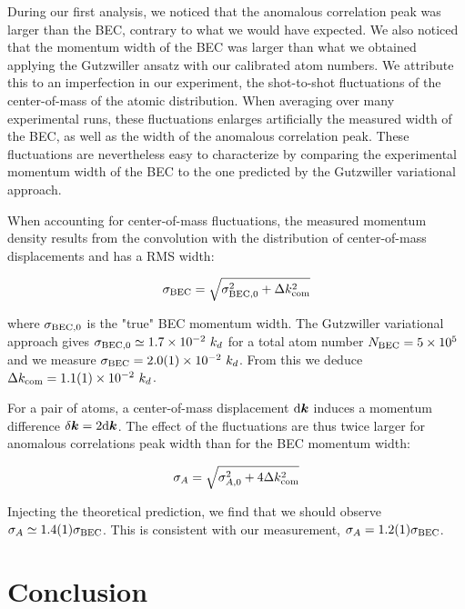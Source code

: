 During our first analysis, we noticed that the anomalous correlation peak was larger than the BEC, contrary to what we would have expected. We also noticed that the momentum width of the BEC was larger than what we obtained applying the Gutzwiller ansatz with our calibrated atom numbers. We attribute this to an imperfection in our experiment, the shot-to-shot fluctuations of the center-of-mass of the atomic distribution. When averaging over many experimental runs, these fluctuations enlarges artificially the measured width of the BEC, as well as the width of the anomalous correlation peak. These fluctuations are nevertheless easy to characterize by comparing the experimental momentum width of the BEC to the one predicted by the Gutzwiller variational approach.

When accounting for center-of-mass fluctuations, the measured momentum density results from the convolution with the distribution of center-of-mass displacements and has a RMS width:

\begin{equation}
    \sigma_{\rm{BEC}}=\sqrt{\sigma_{\rm{BEC},0}^2+\Delta k_{\rm{com}}^2}
\end{equation}

where $\sigma_{\rm{BEC},0}$ is the "true" BEC momentum width. The Gutzwiller variational approach gives  $\sigma_{\rm{BEC},0} \simeq 1.7 \times 10^{-2} \ k_d$ for a total atom number $N_{\rm{BEC}} = 5 \times 10^5$ and we measure $\sigma_{\rm{BEC}}=2.0(1) \times 10^{-2} \ k_d$. From this we deduce $\Delta k_{\rm{com}}=1.1(1) \times 10^{-2} \ k_d$.

For a \kmk pair of atoms, a center-of-mass displacement ${\rm{d}} \bm{k}$ induces a momentum difference $\delta \bm{k}=2 {\rm{d}} \bm{k}$. The effect of the fluctuations are thus twice larger for anomalous correlations peak width than for the BEC momentum width:

\begin{equation}
    \sigma_A = \sqrt{\sigma_{A,0}^2+4\Delta k_{\rm{com}}^2}
\end{equation}

Injecting the theoretical prediction, we find that we should observe $\sigma_A \simeq 1.4(1) \sigma_{\rm BEC}$. This is consistent with our measurement, $\sigma_A = 1.2(1) \sigma_{\rm BEC}$.

\section{Conclusion}




